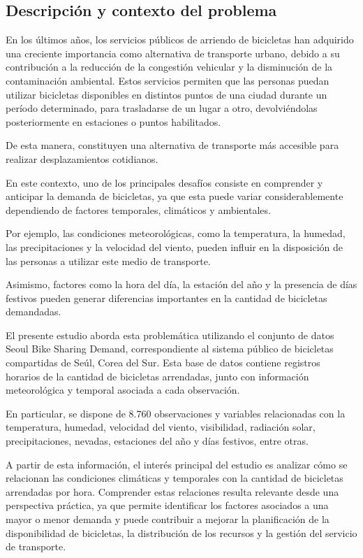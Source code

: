 \documentclass[12pt, a4paper]{article}
\numberwithin{equation}{section}
\begin{document}
\subsection{Descripción y contexto del problema}
En los últimos años, los servicios públicos de arriendo de bicicletas han adquirido una creciente importancia como alternativa de transporte urbano, debido a su contribución a la reducción de la congestión vehicular y la disminución de la contaminación ambiental.
Estos servicios permiten que las personas puedan utilizar bicicletas disponibles en distintos puntos de una ciudad durante un período determinado, para trasladarse de un lugar a otro, devolviéndolas posteriormente en estaciones o puntos habilitados.

De esta manera, constituyen una alternativa de transporte más accesible para realizar desplazamientos cotidianos.

En este contexto, uno de los principales desafíos consiste en comprender y anticipar la demanda de bicicletas, ya que esta puede variar considerablemente dependiendo de factores temporales, climáticos y ambientales.

Por ejemplo, las condiciones meteorológicas, como la temperatura, la humedad, las precipitaciones y la velocidad del viento, pueden influir en la disposición de las personas a utilizar este medio de transporte.

Asimismo, factores como la hora del día, la estación del año y la presencia de días festivos pueden generar diferencias importantes en la cantidad de bicicletas demandadas.

El presente estudio aborda esta problemática utilizando el conjunto de datos
Seoul Bike Sharing Demand, correspondiente al sistema público de bicicletas compartidas de Seúl, Corea del Sur.
Esta base de datos contiene registros horarios de la cantidad de bicicletas arrendadas, junto con información meteorológica y temporal asociada a cada observación.

En particular, se dispone de 8.760 observaciones y variables relacionadas con la temperatura, humedad, velocidad del viento, visibilidad, radiación solar, precipitaciones, nevadas, estaciones del año y días festivos, entre otras.

A partir de esta información, el interés principal del estudio es analizar cómo se relacionan las condiciones climáticas y temporales con la cantidad de bicicletas arrendadas por hora. Comprender estas relaciones resulta relevante desde una perspectiva práctica, ya que permite identificar los factores asociados a una mayor o menor demanda y puede contribuir a mejorar la planificación de la disponibilidad de bicicletas, la distribución de los recursos y la gestión del servicio de transporte.
\end{document}

